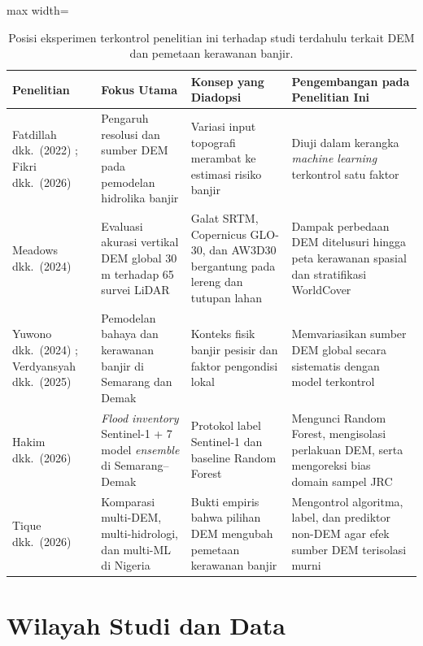 \documentclass[11pt,twoside]{article}
\begin{document}
\begin{table}[!htbp]
\small
\centering
\caption{Posisi eksperimen terkontrol penelitian ini terhadap studi terdahulu terkait DEM dan pemetaan kerawanan banjir.}
\label{tab:prior-studies-id}
\begin{adjustbox}{max width=\textwidth}
\begin{tabular}{>{\raggedright}p{3.0cm} >{\raggedright}p{3.6cm} >{\raggedright}p{3.8cm} >{\raggedright\arraybackslash}p{4.4cm}}
\toprule
\textbf{Penelitian} & \textbf{Fokus Utama} & \textbf{Konsep yang Diadopsi} & \textbf{Pengembangan pada Penelitian Ini} \\
\midrule
Fatdillah dkk.\ (2022) \cite{fatdillah2022}; Fikri dkk.\ (2026) \cite{fikri2026} & Pengaruh resolusi dan sumber DEM pada pemodelan hidrolika banjir & Variasi input topografi merambat ke estimasi risiko banjir & Diuji dalam kerangka \textit{machine learning} terkontrol satu faktor \\
Meadows dkk.\ (2024) \cite{meadows2024} & Evaluasi akurasi vertikal DEM global 30\,m terhadap 65 survei LiDAR & Galat SRTM, Copernicus GLO-30, dan AW3D30 bergantung pada lereng dan tutupan lahan & Dampak perbedaan DEM ditelusuri hingga peta kerawanan spasial dan stratifikasi WorldCover \\
Yuwono dkk.\ (2024) \cite{yuwono2024}; Verdyansyah dkk.\ (2025) \cite{verdyansyah2025} & Pemodelan bahaya dan kerawanan banjir di Semarang dan Demak & Konteks fisik banjir pesisir dan faktor pengondisi lokal & Memvariasikan sumber DEM global secara sistematis dengan model terkontrol \\
Hakim dkk.\ (2026) \cite{hakim2026} & \textit{Flood inventory} Sentinel-1 + 7 model \textit{ensemble} di Semarang--Demak & Protokol label Sentinel-1 dan baseline Random Forest & Mengunci Random Forest, mengisolasi perlakuan DEM, serta mengoreksi bias domain sampel JRC \\
Tique dkk.\ (2026) \cite{Tique2026} & Komparasi multi-DEM, multi-hidrologi, dan multi-ML di Nigeria & Bukti empiris bahwa pilihan DEM mengubah pemetaan kerawanan banjir & Mengontrol algoritma, label, dan prediktor non-DEM agar efek sumber DEM terisolasi murni \\
\bottomrule
\end{tabular}
\end{adjustbox}
\end{table}

\section{Wilayah Studi dan Data}\label{sec:wilayah-data}
\end{document}
